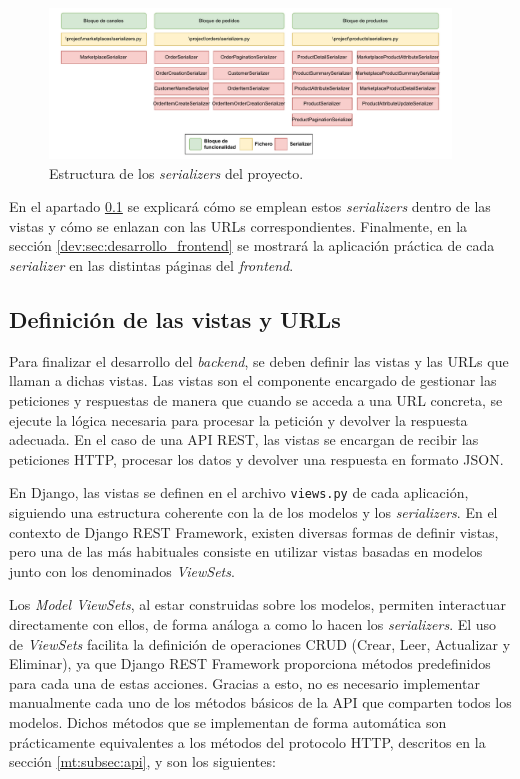 \begin{figure}[H]
    \centering
    \includegraphics[width=0.95\textwidth]{figures/design_develop/estructura_serializers.pdf}
    \caption{Estructura de los \textit{serializers} del proyecto.}
    \label{dev:fig:estructura_serializers}
\end{figure}

En el apartado \ref{dev:subsec:definicion_vistas_urls} se explicará cómo se emplean estos \textit{serializers} dentro de las vistas y cómo se enlazan con las URLs correspondientes. Finalmente, en la sección \ref{dev:sec:desarrollo_frontend} se mostrará la aplicación práctica de cada \textit{serializer} en las distintas páginas del \textit{frontend}.

\subsection{Definición de las vistas y URLs}
\label{dev:subsec:definicion_vistas_urls}

Para finalizar el desarrollo del \textit{backend}, se deben definir las vistas y las URLs que llaman a dichas vistas. Las vistas son el componente encargado de gestionar las peticiones y respuestas de manera que cuando se acceda a una URL concreta, se ejecute la lógica necesaria para procesar la petición y devolver la respuesta adecuada. En el caso de una API REST, las vistas se encargan de recibir las peticiones HTTP, procesar los datos y devolver una respuesta en formato JSON.

En Django, las vistas se definen en el archivo \texttt{views.py} de cada aplicación, siguiendo una estructura coherente con la de los modelos y los \textit{serializers}. En el contexto de Django REST Framework, existen diversas formas de definir vistas, pero una de las más habituales consiste en utilizar vistas basadas en modelos junto con los denominados \textit{ViewSets}.

Los \textit{Model ViewSets}, al estar construidas sobre los modelos, permiten interactuar directamente con ellos, de forma análoga a como lo hacen los \textit{serializers}. El uso de \textit{ViewSets} facilita la definición de operaciones CRUD (Crear, Leer, Actualizar y Eliminar), ya que Django REST Framework proporciona métodos predefinidos para cada una de estas acciones. Gracias a esto, no es necesario implementar manualmente cada uno de los métodos básicos de la API que comparten todos los modelos. Dichos métodos que se implementan de forma automática son prácticamente equivalentes a los métodos del protocolo HTTP, descritos en la sección \ref{mt:subsec:api}, y son los siguientes:

